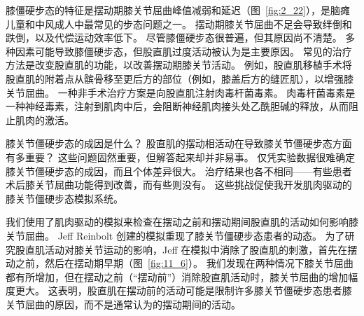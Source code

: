 膝僵硬步态的特征是摆动期膝关节屈曲峰值减弱和延迟（图~\ref{fig:2_22}），是脑瘫儿童和中风成人中最常见的步态问题之一。
摆动期膝关节屈曲不足会导致绊倒和跌倒，以及代偿运动效率低下。
尽管膝僵硬步态很普遍，但其原因尚不清楚。
多种因素可能导致膝僵硬步态，但股直肌过度活动被认为是主要原因。
常见的治疗方法是改变股直肌的功能，以改善摆动期膝关节活动。
例如，股直肌移植手术将股直肌的附着点从髌骨移至更后方的部位（例如，膝盖后方的缝匠肌），以增强膝关节屈曲。
一种非手术治疗方案是向股直肌注射肉毒杆菌毒素。
肉毒杆菌毒素是一种神经毒素，注射到肌肉中后，会阻断神经肌肉接头处乙酰胆碱的释放，从而阻止肌肉的激活。


膝关节僵硬步态的成因是什么？
股直肌的摆动相活动在导致膝关节僵硬步态方面有多重要？
这些问题固然重要，但解答起来却并非易事。
仅凭实验数据很难确定膝关节僵硬步态的成因，而且个体差异很大。
治疗结果也各不相同——有些患者术后膝关节屈曲功能得到改善，而有些则没有。
这些挑战促使我开发肌肉驱动的膝关节僵硬步态模拟系统。


我们使用了肌肉驱动的模拟来检查在摆动之前和摆动期间股直肌的活动如何影响膝关节屈曲。
Jeff Reinbolt 创建的模拟重现了膝关节僵硬步态患者的动态。
为了研究股直肌活动对膝关节运动的影响，Jeff 在模拟中消除了股直肌的刺激，首先在摆动之前，然后在摆动期早期（图~\ref{fig:11_6}）。
我们发现在两种情况下膝关节屈曲都有所增加，但在摆动之前（“摆动前”）消除股直肌活动时，膝关节屈曲的增加幅度更大。
这表明，股直肌在摆动前的活动可能是限制许多膝关节僵硬步态患者膝关节屈曲的原因，而不是通常认为的摆动期间的活动。


